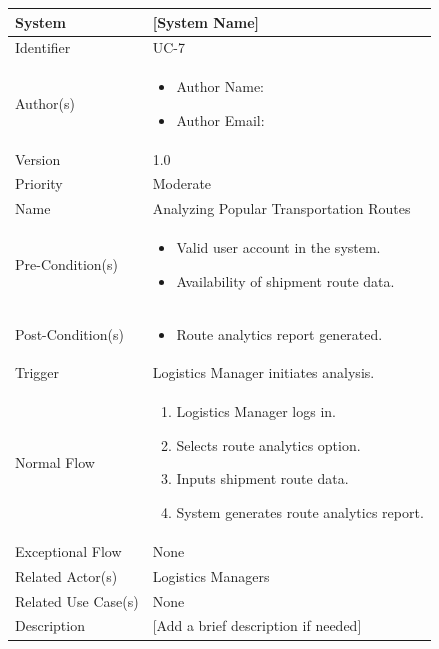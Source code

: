 \begin{center}
	\begin{tabularx}{\textwidth}{|l|X|}
		\hline
		System & [System Name] \\
		\hline
		Identifier & UC-7 \\
		\hline
		Author(s) & \begin{itemize}[left=0pt]
			\item Author Name:
			\item Author Email:
		\end{itemize} \\
		\hline
		Version & 1.0 \\
		\hline
		Priority & Moderate \\
		\hline
		Name & Analyzing Popular Transportation Routes \\
		\hline
		Pre-Condition(s) &  \begin{itemize}[left=0pt]
			\item Valid user account in the system.
			\item Availability of shipment route data.
		\end{itemize} \\
		\hline
		Post-Condition(s) & \begin{itemize}[left=0pt]
			\item Route analytics report generated.
		\end{itemize} \\
		\hline
		Trigger & Logistics Manager initiates analysis. \\
		\hline
		Normal Flow & \begin{enumerate}[left=0pt]
			\item Logistics Manager logs in.
			\item Selects route analytics option.
			\item Inputs shipment route data.
			\item System generates route analytics report.
		\end{enumerate} \\
		\hline
		Exceptional Flow & None \\
		\hline
		Related Actor(s) & Logistics Managers \\
		\hline
		Related Use Case(s) & None \\
		\hline
		Description & [Add a brief description if needed] \\
		\hline
	\end{tabularx}
\end{center}

